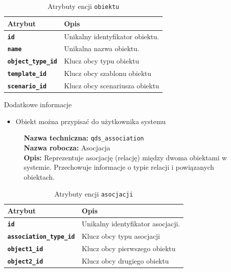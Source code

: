 \begin{table}[H]
    \centering
    \renewcommand{\arraystretch}{1.6}
    \begin{tabular}{|>{\bfseries}l|p{}|}
        \hline
        \rowcolor[HTML]{EFEFEF} \textbf{Atrybut} & \textbf{Opis} \\
        \hline
        \texttt{id} & Unikalny identyfikator obiektu. \\
        \hline
        \texttt{name} & Unikalna nazwa obiektu. \\
        \hline
        \texttt{object\_type\_id} & Klucz obcy typu obiektu \\
        \hline
        \texttt{template\_id} & Klucz obcy szablonu obiektu \\
        \hline
        \texttt{scenario\_id} & Klucz obcy scenariusza obiektu \\
        \hline
    \end{tabular}
    \caption{Atrybuty encji \texttt{obiektu}}
\end{table}

Dodatkowe informacje
\begin{itemize}
    \item Obiekt można przypisać do użytkownika systemu
\end{itemize}

\begin{figure}[H]
    \centering
    \begin{minipage}{0.8\textwidth} 
        \begin{framed}
            \noindent\textbf{\large Nazwa techniczna:} \texttt{qds\_association} \\
            \textbf{\large Nazwa robocza:} Asocjacja \\
            \textbf{\large Opis:} Reprezentuje asocjację (relację) między dwoma obiektami w systemie.
            Przechowuje informacje o typie relacji i powiązanych obiektach.
        \end{framed}
    \end{minipage}
\end{figure}

\begin{table}[H]
    \centering
    \renewcommand{\arraystretch}{1.6}
    \begin{tabular}{|>{\bfseries}l|p{}|}
        \hline
        \rowcolor[HTML]{EFEFEF} \textbf{Atrybut} & \textbf{Opis} \\
        \hline
        \texttt{id} & Unikalny identyfikator asocjacji. \\
        \hline
        \texttt{association\_type\_id} & Klucz obcy typu asocjacji \\
        \hline
        \texttt{object1\_id} & Klucz obcy pierwszego obiektu \\
        \hline
        \texttt{object2\_id} & Klucz obcy drugiego obiektu \\
        \hline
    \end{tabular}
    \caption{Atrybuty encji \texttt{asocjacji}}
\end{table}

